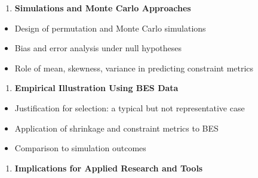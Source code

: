 \documentclass[
  12pt,
]{article}
\providecommand{\tightlist}{%
  \setlength{\itemsep}{0pt}\setlength{\parskip}{0pt}}
\theoremstyle{plain}
\theoremstyle{definition}
\theoremstyle{remark}
\begin{document}
\begin{enumerate}
\def\labelenumi{\arabic{enumi}.}
\setcounter{enumi}{3}
\tightlist
\item
  \textbf{Simulations and Monte Carlo Approaches}
\end{enumerate}

\begin{itemize}
\tightlist
\item
  Design of permutation and Monte Carlo simulations
\item
  Bias and error analysis under null hypotheses
\item
  Role of mean, skewness, variance in predicting constraint metrics
\end{itemize}

\begin{enumerate}
\def\labelenumi{\arabic{enumi}.}
\setcounter{enumi}{4}
\tightlist
\item
  \textbf{Empirical Illustration Using BES Data}
\end{enumerate}

\begin{itemize}
\tightlist
\item
  Justification for selection: a typical but not representative case
\item
  Application of shrinkage and constraint metrics to BES
\item
  Comparison to simulation outcomes
\end{itemize}

\begin{enumerate}
\def\labelenumi{\arabic{enumi}.}
\setcounter{enumi}{5}
\tightlist
\item
  \textbf{Implications for Applied Research and Tools}
\end{enumerate}
\end{document}
